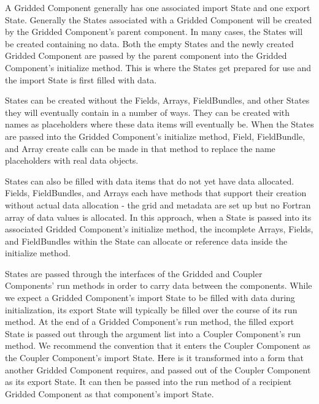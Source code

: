 %


A Gridded Component generally has one associated import 
State and one export State.  Generally the States 
associated with a Gridded Component will be created by 
the Gridded Component's parent component.
In many cases, the States will be created containing 
no data.  Both the empty States and the
newly created Gridded Component are passed
by the parent component into the Gridded Component's initialize 
method.  This is where the States get prepared for use 
and the import State is first filled with data.

States can be created without the Fields, Arrays, FieldBundles,
and other States they will eventually contain in a number 
of ways.  They can be created with names as placeholders where 
these data items will eventually be.  When the States are passed 
into the Gridded Component's initialize method, Field,
FieldBundle, and Array create calls can be made in that method
to replace the name placeholders with real data objects.

States can also be filled with data items that do not yet 
have data allocated.  Fields, FieldBundles, and Arrays each have 
methods that support their creation without actual data 
allocation - the grid and metadata are set up but no
Fortran array of data values is allocated.  In this approach, 
when a State is passed into its associated Gridded Component's 
initialize method, the incomplete Arrays, Fields, and 
FieldBundles within the State can allocate or reference data 
inside the initialize method.

States are passed through the interfaces of the Gridded 
and Coupler Components' run methods in order to carry data 
between the components.  While we expect
a Gridded Component's import State to be filled with data 
during initialization, its export State will typically be
filled over the course of its run method.  At the end of
a Gridded Component's run method, the filled export State 
is passed out through the argument list into a Coupler 
Component's run method.  We recommend the convention that 
it enters the Coupler Component as the Coupler Component's
import State.  Here is it transformed into a form
that another Gridded Component requires, and passed out
of the Coupler Component as its export State.  It can then
be passed into the run method of a recipient Gridded Component
as that component's import State.

